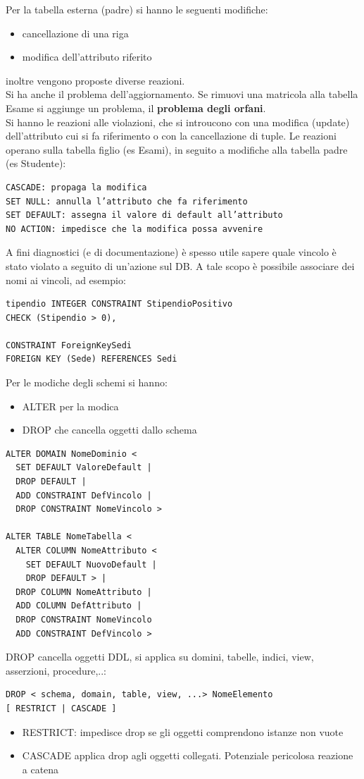 \documentclass[a4paper,12pt, oneside]{book}
\begin{document}
Per la tabella esterna (padre) si hanno le seguenti modifiche:
\begin{itemize}
\item cancellazione di una riga
\item modifica dell'attributo riferito
\end{itemize}
inoltre vengono proposte diverse reazioni.\\
Si ha anche il problema dell'aggiornamento. Se rimuovi una matricola alla tabella Esame si aggiunge un problema, il \textbf{problema degli orfani}.\\
Si hanno le reazioni alle violazioni, che si introucono con una modifica (update) dell’attributo cui si fa riferimento o con la cancellazione di tuple. Le reazioni operano sulla tabella figlio (es Esami), in seguito a modifiche alla tabella padre (es Studente):
\begin{verbatim}
CASCADE: propaga la modifica
SET NULL: annulla l’attributo che fa riferimento
SET DEFAULT: assegna il valore di default all’attributo
NO ACTION: impedisce che la modifica possa avvenire
\end{verbatim}
A fini diagnostici (e di documentazione) è spesso
utile sapere quale vincolo è stato violato a seguito di
un’azione sul DB.
A tale scopo è possibile associare dei nomi ai
vincoli, ad esempio:
\begin{verbatim}
tipendio INTEGER CONSTRAINT StipendioPositivo
CHECK (Stipendio > 0),

CONSTRAINT ForeignKeySedi
FOREIGN KEY (Sede) REFERENCES Sedi
\end{verbatim}
Per le modiche degli schemi si hanno:
\begin{itemize}
\item ALTER per la modica
\item DROP che cancella oggetti dallo schema
\end{itemize}
\begin{verbatim}
ALTER DOMAIN NomeDominio <
  SET DEFAULT ValoreDefault |
  DROP DEFAULT |
  ADD CONSTRAINT DefVincolo |
  DROP CONSTRAINT NomeVincolo >
  
ALTER TABLE NomeTabella <
  ALTER COLUMN NomeAttributo <
    SET DEFAULT NuovoDefault |
    DROP DEFAULT > |
  DROP COLUMN NomeAttributo |
  ADD COLUMN DefAttributo |
  DROP CONSTRAINT NomeVincolo
  ADD CONSTRAINT DefVincolo >
\end{verbatim}
DROP cancella oggetti DDL, si applica su domini, tabelle,
indici, view, asserzioni, procedure,..:
\begin{verbatim}
DROP < schema, domain, table, view, ...> NomeElemento
[ RESTRICT | CASCADE ]
\end{verbatim}
\begin{itemize}
\item RESTRICT: impedisce drop se gli oggetti comprendono istanze
non vuote
\item CASCADE applica drop agli oggetti collegati. Potenziale
pericolosa reazione a catena
\end{itemize}
\end{document}

